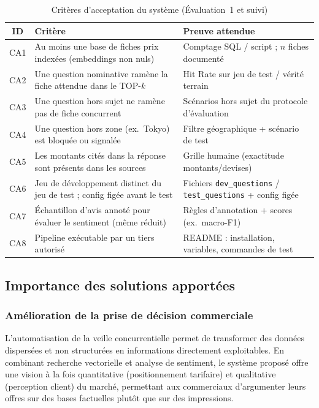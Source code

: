 \begin{table}[H]
\centering
\begingroup
{}
\small
\begin{tabularx}{\textwidth}{|c|X|X|}
\hline
\textbf{ID} & \textbf{Critère} & \textbf{Preuve attendue} \\
\hline
CA1 & Au moins une base de fiches prix indexées (embeddings non nuls)
& Comptage SQL / script ; $n$ fiches documenté \\
\hline
CA2 & Une question nominative ramène la fiche attendue dans le TOP-$k$
& Hit Rate sur jeu de test / vérité terrain \\
\hline
CA3 & Une question hors sujet ne ramène pas de fiche concurrent
& Scénarios hors sujet du protocole d'évaluation \\
\hline
CA4 & Une question hors zone (ex.\ Tokyo) est bloquée ou signalée
& Filtre géographique + scénario de test \\
\hline
CA5 & Les montants cités dans la réponse sont présents dans les sources
& Grille humaine (exactitude montants/devises) \\
\hline
CA6 & Jeu de développement distinct du jeu de test ; config figée avant le test
& Fichiers \texttt{dev\_questions} / \texttt{test\_questions} + config figée \\
\hline
CA7 & Échantillon d'avis annoté pour évaluer le sentiment (même réduit)
& Règles d'annotation + scores (ex.\ macro-F1) \\
\hline
CA8 & Pipeline exécutable par un tiers autorisé
& README : installation, variables, commandes de test \\
\hline
\end{tabularx}
\endgroup
\caption{Critères d'acceptation du système (Évaluation~1 et suivi)}
\label{tab:criteres_acceptation}
\end{table}

\subsection{Importance des solutions apportées}

\subsubsection{Amélioration de la prise de décision commerciale}

L'automatisation de la veille concurrentielle permet de transformer des données dispersées et non
structurées en informations directement exploitables. En combinant recherche vectorielle et analyse de
sentiment, le système proposé offre une vision à la fois quantitative (positionnement tarifaire) et
qualitative (perception client) du marché, permettant aux commerciaux d'argumenter leurs offres sur des
bases factuelles plutôt que sur des impressions.

